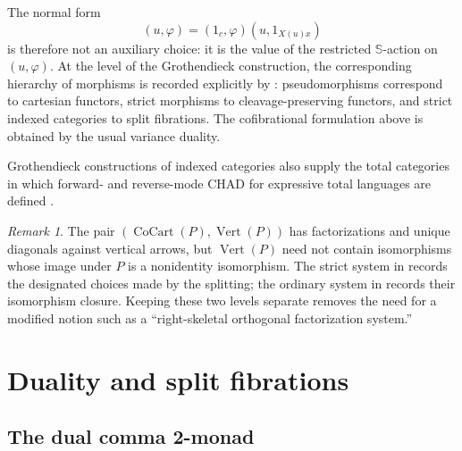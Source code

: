 \documentclass[11pt]{article}
\theoremstyle{plain}
\theoremstyle{definition}
\theoremstyle{remark}
\newtheorem{remark}[theorem]{Remark}
\newcommand{\CoCart}{\operatorname{CoCart}}
\newcommand{\Vrt}{\operatorname{Vert}}
\newcommand{\Sq}{\mathbb{S}}
\numberwithin{equation}{section}
\begin{document}
The normal form
\begin{equation*}
  (u,\varphi)=(1_c,\varphi)(u,1_{X(u)x})
\end{equation*}
is therefore not an auxiliary choice: it is the value of the restricted
$\Sq$-action on $(u,\varphi)$.  At the level of the Grothendieck
construction, the corresponding hierarchy of morphisms is recorded
explicitly by \citet[Proposition~4.1]{LucatelliNunesVakar2025}:
pseudomorphisms correspond to cartesian functors, strict morphisms to
cleavage-preserving functors, and strict indexed categories to split
fibrations.  The cofibrational formulation above is obtained by the
usual variance duality.

Grothendieck constructions of indexed categories also supply the total
categories in which forward- and reverse-mode CHAD for expressive total
languages are defined \citep{LucatelliNunesVakar2023}.

\begin{remark}\label{rem:right-skeletal}
The pair $(\CoCart(P),\Vrt(P))$ has factorizations and unique
diagonals against vertical arrows, but $\Vrt(P)$ need not contain
isomorphisms whose image under $P$ is a nonidentity isomorphism.  The
strict system in  records the designated choices made by
the splitting; the ordinary system in  records their
isomorphism closure.  Keeping these two levels separate removes the
need for a modified notion such as a ``right-skeletal orthogonal
factorization system.''
\end{remark}

\section{Duality and split fibrations}
\label{sec:dual}

\subsection{The dual comma 2-monad}
\end{document}
